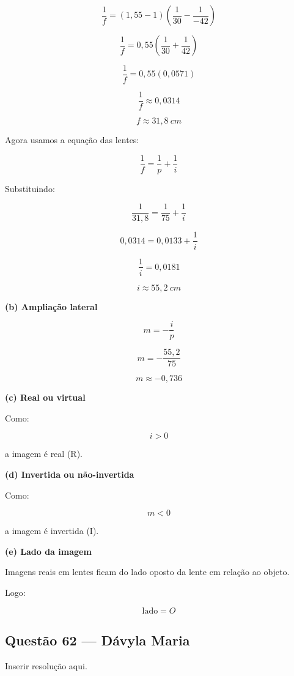 \documentclass[12pt,a4paper]{article}
\begin{document}
\[
\frac{1}{f}
=
(1,55-1)
\left(
\frac{1}{30}
-
\frac{1}{-42}
\right)
\]

\[
\frac{1}{f}
=
0,55
\left(
\frac{1}{30}
+
\frac{1}{42}
\right)
\]

\[
\frac{1}{f}
=
0,55(0,0571)
\]

\[
\frac{1}{f}\approx0,0314
\]

\[
f\approx31,8\ cm
\]

\vspace{0.5cm}

Agora usamos a equação das lentes:

\[
\frac{1}{f}
=
\frac{1}{p}
+
\frac{1}{i}
\]

Substituindo:

\[
\frac{1}{31,8}
=
\frac{1}{75}
+
\frac{1}{i}
\]

\[
0,0314
=
0,0133
+
\frac{1}{i}
\]

\[
\frac{1}{i}=0,0181
\]

\[
i\approx55,2\ cm
\]

\vspace{0.5cm}

\textbf{(b) Ampliação lateral}

\[
m=-\frac{i}{p}
\]

\[
m=-\frac{55,2}{75}
\]

\[
m\approx-0,736
\]

\vspace{0.5cm}

\textbf{(c) Real ou virtual}

Como:

\[
i>0
\]

a imagem é real (R).

\vspace{0.5cm}

\textbf{(d) Invertida ou não-invertida}

Como:

\[
m<0
\]

a imagem é invertida (I).

\vspace{0.5cm}

\textbf{(e) Lado da imagem}

Imagens reais em lentes ficam do lado oposto da lente em relação ao objeto.

Logo:

\[
\text{lado} = O
\]

\subsection{Questão 62 — Dávyla Maria}
Inserir resolução aqui.
\end{document}
